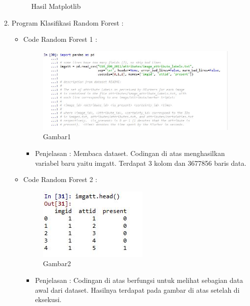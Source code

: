 \begin{enumerate}
\begin{figure}[ht]
	\caption{Hasil Matplotlib}
	\label{contoh}
	\end{figure}
\par
\par
\item Program Klasifikasi Random Forest :
\begin{itemize}
\item Code Random Forest 1 :
\par
\begin{figure}[ht]
\centering
\includegraphics[scale=0.7]{figures/AFS/4a.jpg}
\caption{Gambar1}
\label{contoh}
\end{figure}
\par
\begin{itemize}
\item Penjelasan : Membaca dataset. Codingan di atas menghasilkan variabel baru yaitu imgatt. Terdapat 3 kolom dan 3677856 baris data.
\par 
\par
\end{itemize}
\item Code Random Forest 2 :
\par
\begin{figure}[ht]
\centering
\includegraphics[scale=0.7]{figures/AFS/4b.jpg}
\caption{Gambar2}
\label{contoh}
\end{figure}
\par
\begin{itemize}
\item Penjelasan : Codingan di atas berfungsi untuk melihat sebagian data awal dari dataset. Hasilnya terdapat pada gambar di atas setelah di eksekusi.

\end{itemize}
\end{itemize}
\end{enumerate}
